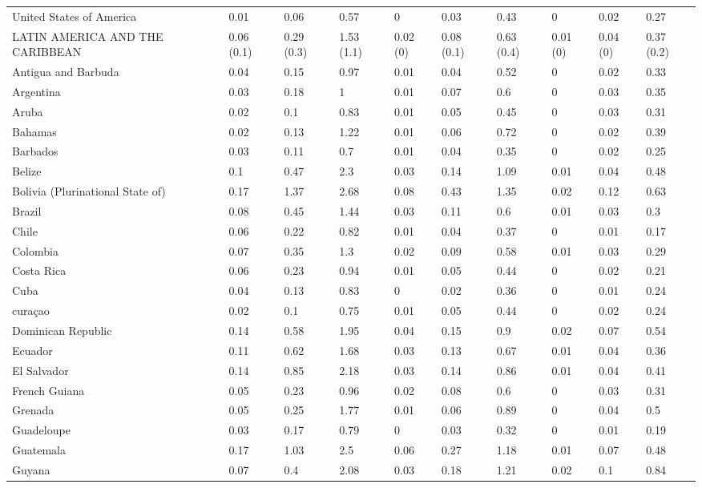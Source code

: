 \begin{longtable}[t]{llllllllll}
United States of America & 0.01 & 0.06 & 0.57 & 0 & 0.03 & 0.43 & 0 & 0.02 & 0.27\\
LATIN AMERICA AND THE CARIBBEAN & 0.06 (0.1) & 0.29 (0.3) & 1.53 (1.1) & 0.02 (0) & 0.08 (0.1) & 0.63 (0.4) & 0.01 (0) & 0.04 (0) & 0.37 (0.2)\\
Antigua and Barbuda & 0.04 & 0.15 & 0.97 & 0.01 & 0.04 & 0.52 & 0 & 0.02 & 0.33\\
Argentina & 0.03 & 0.18 & 1 & 0.01 & 0.07 & 0.6 & 0 & 0.03 & 0.35\\
Aruba & 0.02 & 0.1 & 0.83 & 0.01 & 0.05 & 0.45 & 0 & 0.03 & 0.31\\
Bahamas & 0.02 & 0.13 & 1.22 & 0.01 & 0.06 & 0.72 & 0 & 0.02 & 0.39\\
Barbados & 0.03 & 0.11 & 0.7 & 0.01 & 0.04 & 0.35 & 0 & 0.02 & 0.25\\
Belize & 0.1 & 0.47 & 2.3 & 0.03 & 0.14 & 1.09 & 0.01 & 0.04 & 0.48\\
Bolivia (Plurinational State of) & 0.17 & 1.37 & 2.68 & 0.08 & 0.43 & 1.35 & 0.02 & 0.12 & 0.63\\
Brazil & 0.08 & 0.45 & 1.44 & 0.03 & 0.11 & 0.6 & 0.01 & 0.03 & 0.3\\
Chile & 0.06 & 0.22 & 0.82 & 0.01 & 0.04 & 0.37 & 0 & 0.01 & 0.17\\
Colombia & 0.07 & 0.35 & 1.3 & 0.02 & 0.09 & 0.58 & 0.01 & 0.03 & 0.29\\
Costa Rica & 0.06 & 0.23 & 0.94 & 0.01 & 0.05 & 0.44 & 0 & 0.02 & 0.21\\
Cuba & 0.04 & 0.13 & 0.83 & 0 & 0.02 & 0.36 & 0 & 0.01 & 0.24\\
curaçao & 0.02 & 0.1 & 0.75 & 0.01 & 0.05 & 0.44 & 0 & 0.02 & 0.24\\
Dominican Republic & 0.14 & 0.58 & 1.95 & 0.04 & 0.15 & 0.9 & 0.02 & 0.07 & 0.54\\
Ecuador & 0.11 & 0.62 & 1.68 & 0.03 & 0.13 & 0.67 & 0.01 & 0.04 & 0.36\\
El Salvador & 0.14 & 0.85 & 2.18 & 0.03 & 0.14 & 0.86 & 0.01 & 0.04 & 0.41\\
French Guiana & 0.05 & 0.23 & 0.96 & 0.02 & 0.08 & 0.6 & 0 & 0.03 & 0.31\\
Grenada & 0.05 & 0.25 & 1.77 & 0.01 & 0.06 & 0.89 & 0 & 0.04 & 0.5\\
Guadeloupe & 0.03 & 0.17 & 0.79 & 0 & 0.03 & 0.32 & 0 & 0.01 & 0.19\\
Guatemala & 0.17 & 1.03 & 2.5 & 0.06 & 0.27 & 1.18 & 0.01 & 0.07 & 0.48\\
Guyana & 0.07 & 0.4 & 2.08 & 0.03 & 0.18 & 1.21 & 0.02 & 0.1 & 0.84\\

\end{longtable}
